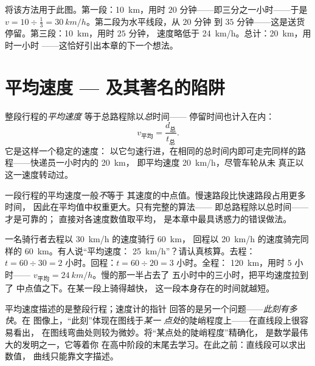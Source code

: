 \begin{example}[解读快递员的行程]\label{ex:g7:motion-average-speed:decoded}
将该方法用于此图。第一段：\qty{10}{km}，用时
$20$ 分钟——即三分之一小时——于是 $v = 10 \div
\tfrac{1}{3} = \qty{30}{km/h}$。第二段为水平线段，从 $20$ 分钟
到 $35$ 分钟——这是送货停留。第三段：\qty{10}{km}，用时 $25$ 分钟，
速度略低于 \qty{24}{km/h}。总计：\qty{20}{km}，用时一小时
——这恰好引出本章的下一个想法。
\end{example}

\section{平均速度 --- 及其著名的陷阱}

\begin{definition}[平均速度]\label{def:g7:motion-average-speed:average}
整段行程的\emph{平均速度}
等于总路程除以\emph{总}时间——
停留时间也计入在内：
\[
v_{\text{平均}} = \frac{d_{\text{总}}}{t_{\text{总}}}.
\]
它是这样一个稳定的速度：
以它匀速行进，在相同的总时间内即可走完同样的路程——快递员一小时内的 \qty{20}{km}，
即平均速度 \qty{20}{km/h}，尽管车轮从未
真正以这一速度转动过。
\end{definition}

\begin{proposition}[陷阱]\label{prop:g7:motion-average-speed:trap}
一段行程的平均速度一般\emph{不}等于
其速度的中点值。慢速路段比快速路段占用更多时间，
因此在平均值中权重更大。只有完整的算法——
即总路程除以总时间——才是可靠的；
直接对各速度数值取平均，
是本章中最具诱惑力的错误做法。
\end{proposition}

\begin{example}[陷阱揭晓]\label{ex:g7:motion-average-speed:sprung}
一名骑行者去程以 \qty{30}{km/h} 的速度骑行 \qty{60}{km}，
回程以 \qty{20}{km/h} 的速度骑完同样的 \qty{60}{km}。有人说“平均速度：
\qty{25}{km/h}”？请认真核算。去程：$t = 60 \div 30 = 2$
小时。回程：$t = 60 \div 20 = 3$ 小时。全程：
\qty{120}{km}，用时 $5$ 小时——
$v_{\text{平均}} = \qty{24}{km/h}$。慢的那一半占去了
五小时中的三小时，把平均速度拉到了
中点值之下。在某一段上骑得越快，
这一段本身存在的时间就越短。
\end{example}

\begin{remark}[速度计说明了什么]\label{rem:g7:motion-average-speed:speedometer}
平均速度描述的是整段行程；速度计的指针
回答的是另一个问题——\emph{此刻有多快}。在
图像上，“此刻”体现在图线于\emph{某一
点处}的陡峭程度上——在直线段上很容易看出，
在图线弯曲处则较为微妙。将“某点处的陡峭程度”精确化，
是数学最伟大的发明之一，它等着你
在高中阶段的末尾去学习。在此之前：直线段可以求出数值，
曲线只能靠文字描述。
\end{remark}

